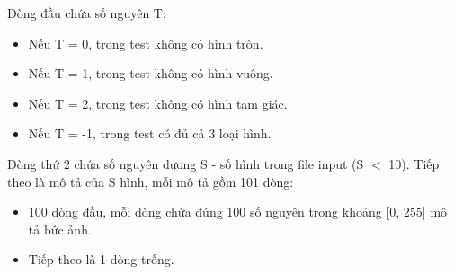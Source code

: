 Dòng đầu chứa số nguyên T:
\begin{itemize}
	\item Nếu T = 0, trong test không có hình tròn.
	\item Nếu T = 1, trong test không có hình vuông.
	\item Nếu T = 2, trong test không có hình tam giác.
	\item Nếu T = -1, trong test có đủ cả 3 loại hình.
\end{itemize}

Dòng thứ 2 chứa số nguyên dương S - số hình trong file input (S $<$ 10). Tiếp theo là mô tả của S hình, mỗi mô tả gồm 101 dòng:
\begin{itemize}
	\item 100 dòng đầu, mỗi dòng chứa đúng 100 số nguyên trong khoảng [0, 255] mô tả bức ảnh.
	\item Tiếp theo là 1 dòng trống.
\end{itemize}